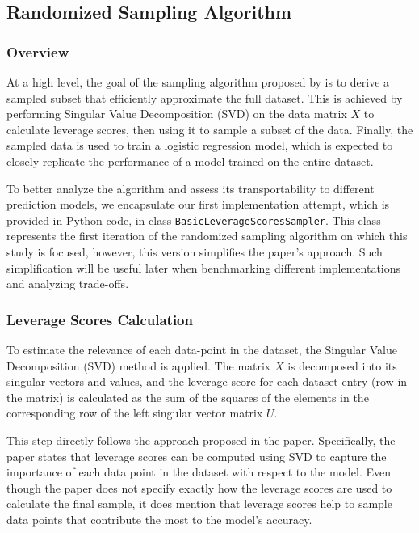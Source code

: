 \documentclass{article}
\theoremstyle{plain}
\theoremstyle{definition}
\theoremstyle{remark}
\begin{document}
\subsection{Randomized Sampling Algorithm}

\subsubsection{Overview}

At a high level, the goal of the sampling algorithm proposed by \citeauthor{chow24} is to derive a sampled subset that efficiently approximate the full dataset. This is achieved by performing Singular Value Decomposition (SVD) on the data matrix $X$ to calculate leverage scores, then using it to sample a subset of the data. Finally, the sampled data is used to train a logistic regression model, which is expected to closely replicate the performance of a model trained on the entire dataset.

To better analyze the algorithm and assess its transportability to different prediction models, we encapsulate our first implementation attempt, which is provided in Python code, in class \texttt{BasicLeverageScoresSampler}. This class represents the first iteration of the randomized sampling algorithm on which this study is focused, however, this version simplifies the paper's approach. Such simplification will be useful later when benchmarking different implementations and analyzing trade-offs.


\subsubsection{Leverage Scores Calculation}

To estimate the relevance of each data-point in the dataset, the Singular Value Decomposition (SVD) method is applied. The matrix $X$ is decomposed into its singular vectors and values, and the leverage score for each dataset entry (row in the matrix) is calculated as the sum of the squares of the elements in the corresponding row of the left singular vector matrix $U$.

This step directly follows the approach proposed in the paper. Specifically, the paper states that leverage scores can be computed using SVD to capture the importance of each data point in the dataset with respect to the model. Even though the paper does not specify exactly how the leverage scores are used to calculate the final sample, it does mention that leverage scores help to sample data points that contribute the most to the model’s accuracy.
\end{document}
